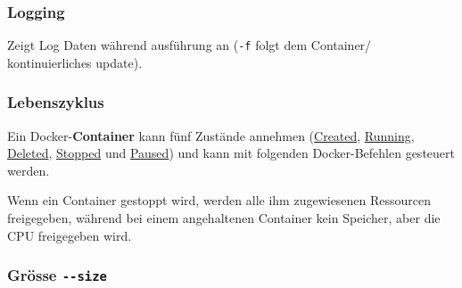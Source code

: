 \documentclass[
  10pt,
  a4paper,
  twocolumn]{article}
\newenvironment{Shaded}{}{}
\newcommand{\ExtensionTok}[1]{\textcolor[rgb]{0.84,0.23,0.29}{\textbf{#1}}}
\newcommand{\NormalTok}[1]{\textcolor[rgb]{0.14,0.16,0.18}{#1}}
\newcommand{\OperatorTok}[1]{\textcolor[rgb]{0.14,0.16,0.18}{#1}}
\begin{document}
\subsubsection{\texorpdfstring{{\small \faTerminal\hspace{1mm}}
Logging}{ Logging}}\label{logging}

Zeigt Log Daten während ausführung an (\texttt{-f} folgt dem Container/
kontinuierliches update).

\begin{Shaded}
\end{Shaded}

\subsubsection{Lebenszyklus}\label{lebenszyklus}

Ein Docker-\textbf{Container} kann fünf Zustände annehmen (\ul{Created},
\ul{Running}, \ul{Deleted}, \ul{Stopped} und \ul{Paused}) und kann mit
folgenden Docker-Befehlen gesteuert werden.

\resizebox{\columnwidth}{!}{
  
}

\begin{tcolorbox}[enhanced jigsaw, toprule=.15mm, opacityback=0, colbacktitle=quarto-callout-note-color!10!white, breakable, colframe=quarto-callout-note-color-frame, title=\textcolor{quarto-callout-note-color}{\faInfo}\hspace{0.5em}{Unterschied \emph{Stopped} und \emph{Paused}}, left=2mm, arc=.35mm, toptitle=1mm, bottomrule=.15mm, rightrule=.15mm, titlerule=0mm, bottomtitle=1mm, leftrule=.75mm, opacitybacktitle=0.6, coltitle=black, colback=white]

Wenn ein Container gestoppt wird, werden alle ihm zugewiesenen
Ressourcen freigegeben, während bei einem angehaltenen Container kein
Speicher, aber die CPU freigegeben wird.

\end{tcolorbox}

\subsubsection{\texorpdfstring{{\small \faTerminal\hspace{1mm}} Grösse
\texttt{-\/-size}}{ Grösse -\/-size}}\label{gruxf6sse---size}
\end{document}

